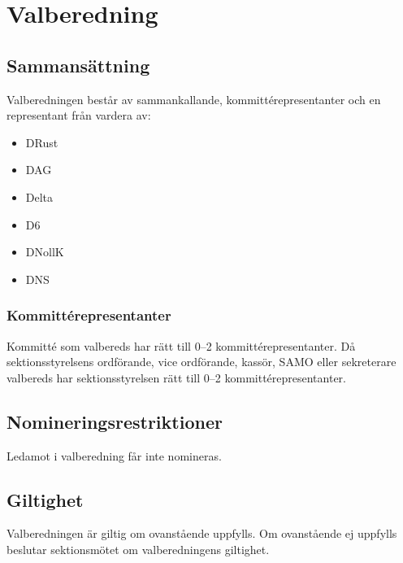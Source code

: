 \section{Valberedning}
\subsection{Sammansättning}
Valberedningen består av sammankallande, kommittérepresentanter och
en representant från vardera av:
\begin{itemize}
  \item DRust
  \item DAG 
  \item Delta 
  \item D6 
  \item DNollK
  \item DNS
\end{itemize}
\subsubsection{Kommittérepresentanter}
Kommitté som valbereds har rätt till 0–2 kommittérepresentanter. Då 
sektionsstyrelsens ordförande, vice ordförande, kassör, SAMO eller 
sekreterare valbereds har sektionsstyrelsen rätt till 0–2 kommittérepresentanter.
\subsection{Nomineringsrestriktioner}
Ledamot i valberedning får inte nomineras.
\subsection{Giltighet}
Valberedningen är giltig om ovanstående uppfylls. Om ovanstående ej uppfylls 
beslutar sektionsmötet om valberedningens giltighet.
\newpage